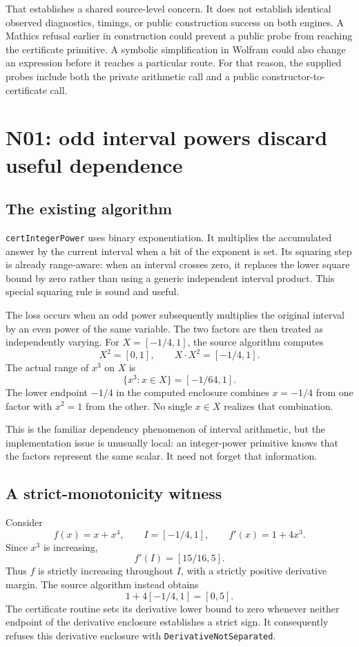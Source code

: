 \documentclass[11pt,a4paper]{article}
\newcommand{\code}[1]{\nolinkurl{#1}}
\begin{document}
That establishes a shared source-level concern. It does not establish identical observed diagnostics, timings, or public construction success on both engines. A Mathics refusal earlier in construction could prevent a public probe from reaching the certificate primitive. A symbolic simplification in Wolfram could also change an expression before it reaches a particular route. For that reason, the supplied probes include both the private arithmetic call and a public constructor-to-certificate call.

\section{N01: odd interval powers discard useful dependence}
\subsection{The existing algorithm}

\code{certIntegerPower} uses binary exponentiation. It multiplies the accumulated answer by the current interval when a bit of the exponent is set. Its squaring step is already range-aware: when an interval crosses zero, it replaces the lower square bound by zero rather than using a generic independent interval product. This special squaring rule is sound and useful.\cite{cert}

The loss occurs when an odd power subsequently multiplies the original interval by an even power of the same variable. The two factors are then treated as independently varying. For $X=[-1/4,1]$, the source algorithm computes
\[
X^2=[0,1],\qquad X\cdot X^2=[-1/4,1].
\]
The actual range of $x^3$ on $X$ is
\[
\{x^3:x\in X\}=[-1/64,1].
\]
The lower endpoint $-1/4$ in the computed enclosure combines $x=-1/4$ from one factor with $x^2=1$ from the other. No single $x\in X$ realizes that combination.

This is the familiar dependency phenomenon of interval arithmetic, but the implementation issue is unusually local: an integer-power primitive knows that the factors represent the same scalar. It need not forget that information.

\subsection{A strict-monotonicity witness}

Consider
\[
f(x)=x+x^4,\qquad I=[-1/4,1],\qquad f'(x)=1+4x^3.
\]
Since $x^3$ is increasing,
\[
f'(I)=[15/16,5].
\]
Thus $f$ is strictly increasing throughout $I$, with a strictly positive derivative margin. The source algorithm instead obtains
\[
1+4[-1/4,1]=[0,5].
\]
The certificate routine sets its derivative lower bound to zero whenever neither endpoint of the derivative enclosure establishes a strict sign. It consequently refuses this derivative enclosure with \code{DerivativeNotSeparated}.\cite{cert}
\end{document}
